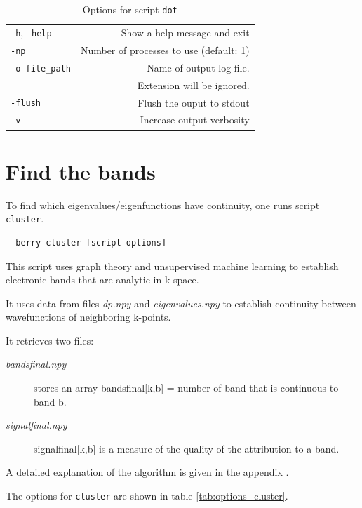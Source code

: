 \documentclass[a4paper,12pt]{report}
\begin{document}
\begin{table}[h]
 \centering
 \caption{Options for script \texttt{dot}}\label{tab:options_dot}
\begin{tabular}[]{lr}
\hline
  \texttt{-h}, \texttt{--help}  &\hspace*{2cm} Show a help message and exit \\
  \texttt{-np}                  & Number of processes to use (default: 1) \\
  \texttt{-o file\_path}        & Name of output log file.\\
                                & Extension will be ignored. \\
  \texttt{-flush}               & Flush the ouput to stdout \\
  \texttt{-v}                   & Increase output verbosity \\
  \hline
\end{tabular}
\end{table}



\section{Find the bands}
To find which eigenvalues/eigenfunctions have continuity, one runs script \texttt{cluster}.

\begin{verbatim}
  berry cluster [script options]
\end{verbatim}

This script uses graph theory and unsupervised machine learning to establish electronic bands
that are analytic in k-space.

It uses data from files \emph{dp.npy} and \emph{eigenvalues.npy} to establish continuity
between wavefunctions of neighboring k-points.

 It retrieves two files:
 \begin{description}
   \item[\emph{bandsfinal.npy}] stores an array bandsfinal[k,b] = number of band that is continuous to band b.
   \item[\emph{signalfinal.npy}] signalfinal[k,b] is a measure of the quality of the attribution to a band.
 \end{description}

 A detailed explanation of the algorithm is given in the appendix .

 The options for \texttt{cluster} are shown in table \ref{tab:options_cluster}.
\end{document}
